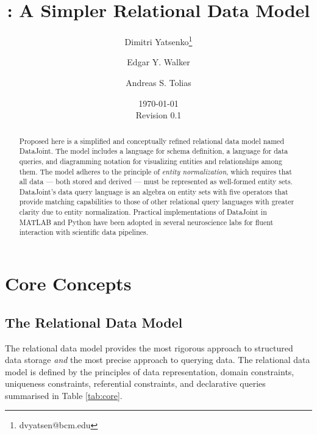 \documentclass[letter,10pt]{article}
\author[1,2]{Dimitri Yatsenko\thanks{dvyatsen@bcm.edu}}
\author[1,2]{Edgar Y. Walker}
\author[1,2]{Andreas S. Tolias}
\affil[1]{Department of Neuroscience, Baylor College of Medicine, Houston, Texas, USA}
\affil[2]{Vathes LLC, Houston, Texas, USA}
\date{\today\\Revision 0.1}
\title{\datajoint: A Simpler Relational Data Model}
\newcommand{\datajoint}{DataJoint\xspace}
\begin{document}
\maketitle
\begin{abstract}
Proposed here is a simplified and conceptually refined relational data model named \datajoint. 
The model includes a language for schema definition, a language for data queries, and diagramming notation for visualizing entities and relationships among them.  
The model adheres to the principle of \emph{entity normalization}, which requires that all data --- both stored and derived --- must be represented as well-formed entity sets.
\datajoint's data query language is an algebra on entity sets with five operators that provide matching capabilities to those of other relational query languages with greater clarity due to entity normalization. 
Practical implementations of \datajoint in MATLAB and Python have been adopted in several neuroscience labs for fluent interaction with scientific data pipelines.
\end{abstract}
\tableofcontents 

\twocolumn

\section{Core Concepts}
\subsection{The Relational Data Model}
The relational data model \citep{codd_relational_1970} provides the most rigorous approach to structured data storage \emph{and} the most precise approach to querying data.  
The relational data model is defined by the principles of data representation, domain constraints, uniqueness constraints, referential constraints, and declarative queries summarised in Table \ref{tab:core}.
\end{document}
